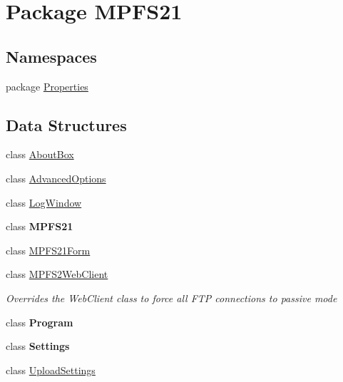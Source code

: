 \hypertarget{namespace_m_p_f_s21}{}\section{Package M\+P\+F\+S21}
\label{namespace_m_p_f_s21}
\subsection*{Namespaces}
\begin{DoxyCompactItemize}
\item 
package \hyperlink{namespace_m_p_f_s21_1_1_properties}{Properties}
\end{DoxyCompactItemize}
\subsection*{Data Structures}
\begin{DoxyCompactItemize}
\item 
class \hyperlink{class_m_p_f_s21_1_1_about_box}{About\+Box}
\item 
class \hyperlink{class_m_p_f_s21_1_1_advanced_options}{Advanced\+Options}
\item 
class \hyperlink{class_m_p_f_s21_1_1_log_window}{Log\+Window}
\item 
class {\bfseries M\+P\+F\+S21}
\item 
class \hyperlink{class_m_p_f_s21_1_1_m_p_f_s21_form}{M\+P\+F\+S21\+Form}
\item 
class \hyperlink{class_m_p_f_s21_1_1_m_p_f_s2_web_client}{M\+P\+F\+S2\+Web\+Client}
\begin{DoxyCompactList}\small\item\em Overrides the Web\+Client class to force all F\+T\+P connections to passive mode \end{DoxyCompactList}\item 
class {\bfseries Program}
\item 
class {\bfseries Settings}
\item 
class \hyperlink{class_m_p_f_s21_1_1_upload_settings}{Upload\+Settings}
\end{DoxyCompactItemize}
